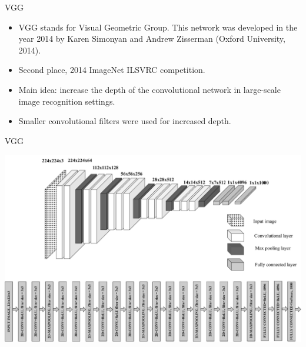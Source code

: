 \documentclass{beamer}
\begin{document}
\begin{frame}{VGG}

\begin{itemize}
    \item  VGG stands for Visual Geometric Group. This network was developed in the year 2014 by Karen Simonyan and Andrew Zisserman (Oxford University, 2014).
    \item Second place, 2014 ImageNet ILSVRC competition. 
    \item Main idea: increase the depth of the convolutional network in large-scale image recognition settings. 
     \item Smaller convolutional filters were used for increased depth.  
\end{itemize}    
\end{frame}
\begin{frame}{VGG}

\includegraphics[width=\textwidth]{Module 4 (CNN)/pics/vgg_net.pdf}
    
\end{frame}
\end{document}

